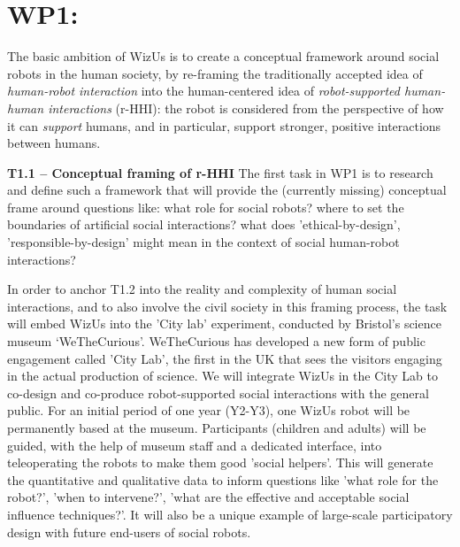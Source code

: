 \documentclass[11pt,a4paper]{report}
\newcommand{\project}{WizUs\xspace}
\begin{document}

\begin{figure}[!ht]
\resizebox{\linewidth}{!}{
    
}
\end{figure}



\section{WP1: \textbf{\wpOne}}

\noindent{}

The basic ambition of \project is to create a conceptual framework around social
robots in the human society, by re-framing the traditionally accepted idea of
\emph{human-robot interaction} into the human-centered idea of
\emph{robot-supported human-human interactions} (r-HHI): the robot is considered
from the perspective of how it can \emph{support} humans, and in particular,
support stronger, positive interactions between humans.

\textbf{T1.1 -- Conceptual framing of r-HHI} The first task in WP1 is to research and
define such a framework that will provide the (currently missing) conceptual
frame around questions like: what role for social robots? where to set the
boundaries of artificial social interactions? what does 'ethical-by-design',
'responsible-by-design' might mean in the context of social human-robot
interactions? 

In order to anchor T1.2 into the reality and complexity of human social
interactions, and to also involve the civil society in this framing process, the
task will embed \project into the 'City lab' experiment, conducted by Bristol's
science museum `WeTheCurious'. WeTheCurious has developed a new form of
public engagement called 'City Lab', the first in the UK that sees the visitors
engaging in the actual production of science. We will integrate \project in the
City Lab to co-design and co-produce robot-supported social interactions with
the general public. For an initial period of one year (Y2-Y3), one \project
robot will be permanently based at the museum.  Participants (children and
adults) will be guided, with the help of museum staff and a dedicated interface,
into teleoperating the robots to make them good 'social helpers'. This will
generate the quantitative and qualitative data to inform questions like 'what
role for the robot?', 'when to intervene?', 'what are the effective and
acceptable social influence techniques?'. It will also be a unique example of
large-scale participatory design with future end-users of social robots.
\end{document}
